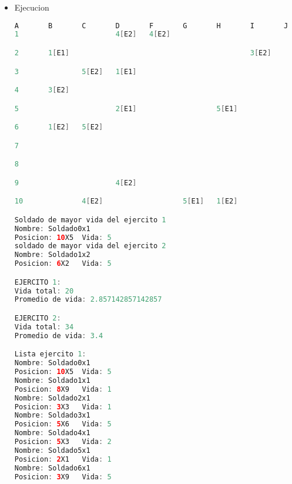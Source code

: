 \documentclass{article}
\begin{document}
\begin{itemize}
\begin{itemize}
\begin{lstlisting}[language=java]
	public void setFila(int fila) {
		this.fila = fila;
	}

	public void setColumna(int columna) {
		this.columna = columna;
	}

	public void setPuntos(int puntos) {
		this.puntos = puntos;
	}
	
	public void setColumn(String column) {
		this.column = column;
	}

	// METODOS ACCESORES
	public String getNombre() {
		return nombre;
	}

	public int getFila() {
		return fila;
	}

	public int getColumna() {
		return columna;
	}

	public int getPuntos() {
		return puntos;
	}
	
	public String getColumn() {
		return column;
	}
}
         \end{lstlisting}

         \item Ejecucion
         \begin{lstlisting}[language=java]
        A       B       C       D       F       G       H       I       J
1                       4[E2]   4[E2]

2       1[E1]                                           3[E2]

3               5[E2]   1[E1]                                           5[E1]

4       3[E2]

5                       2[E1]                   5[E1]

6       1[E2]   5[E2]

7

8                                                                       1[E1]

9                       4[E2]

10              4[E2]                   5[E1]   1[E2]

Soldado de mayor vida del ejercito 1
Nombre: Soldado0x1
Posicion: 10X5  Vida: 5
soldado de mayor vida del ejercito 2
Nombre: Soldado1x2
Posicion: 6X2   Vida: 5

EJERCITO 1:
Vida total: 20
Promedio de vida: 2.857142857142857

EJERCITO 2:
Vida total: 34
Promedio de vida: 3.4

Lista ejercito 1:
Nombre: Soldado0x1
Posicion: 10X5  Vida: 5
Nombre: Soldado1x1
Posicion: 8X9   Vida: 1
Nombre: Soldado2x1
Posicion: 3X3   Vida: 1
Nombre: Soldado3x1
Posicion: 5X6   Vida: 5
Nombre: Soldado4x1
Posicion: 5X3   Vida: 2
Nombre: Soldado5x1
Posicion: 2X1   Vida: 1
Nombre: Soldado6x1
Posicion: 3X9   Vida: 5


\end{lstlisting}
\end{itemize}
\end{itemize}
\end{document}
